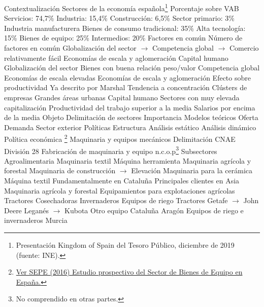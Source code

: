 \documentclass{nuevotema}
\begin{document}
\begin{esquemal}
	\1[] 
		\2 Contextualización
			\3 Sectores de la economía española\footnote{Presentación Kingdom of Spain del Tesoro Público, diciembre de 2019 (fuente: INE).}
				\4 Porcentaje sobre VAB
				\4 Servicios: 74,7\%
				\4 Industria: 15,4\%
				\4 Construcción: 6,5\%
				\4 Sector primario: 3\%
				\4 Industria manufacturera
				\4[] Bienes de consumo tradicional: 35\%
				\4[] Alta tecnología: 15\%
				\4[] Bienes de equipo: 25\%
				\4[] Intermedios: 20\%
			\3 Factores en común
				\4 Número de factores en común
				\4[] Globalización del sector
				\4[] $\to$ Competencia global
				\4[] $\to$ Comercio relativamente fácil
				\4[] Economías de escala y aglomeración
				\4[] Capital humano
			\3 Globalización del sector
				\4 Bienes con buena relación peso/valor
				\4 Competencia global
				\4 Economías de escala elevadas
			\3 Economías de escala y aglomeración
				\4 Efecto sobre productividad
				\4 Ya descrito por Marshal
				\4 Tendencia a concentración
				\4[] Clústers de empresas
				\4[] Grandes áreas urbanas
			\3 Capital humano
				\4 Sectores con muy elevada capitalización
				\4 Productividad del trabajo superior a la media
				\4 Salarios por encima de la media
		\2 Objeto
			\3 Delimitación de sectores
			\3 Importancia
			\3 Modelos teóricos
			\3 Oferta
			\3 Demanda
			\3 Sector exterior
			\3 Políticas
		\2 Estructura
			\3 Análisis estático
			\3 Análisis dinámico
			\3 Política económica
	\1 \footnote{\href{https://www.sepe.es/contenidos/observatorio/mercado_trabajo/2731-2.pdf}{Ver SEPE (2016) Estudio prospectivo del Sector de Bienes de Equipo en España.}}
		\2 Maquinaria y equipos mecánicos
			\3 Delimitación
				\4 CNAE División 28
				\4[] Fabricación de maquinaria y equipo n.c.o.p\footnote{No comprendido en otras partes.}
				\4 Subsectores
				\4[] Agroalimentaria
				\4[] Maquinaria textil
				\4[] Máquina herramienta
				\4[] Maquinaria agrícola y forestal
				\4[] Maquinaria de construcción
				\4[] $\to$ Elevación
				\4[] Maquinaria para la cerámica
			\3 Máquina textil
				\4 Fundamentalmente en Cataluña
				\4 Principales clientes en Asia
			\3 Maquinaria agrícola y forestal
				\4 Equipamientos para explotaciones agrícolas
				\4[] Tractores
				\4[] Cosechadoras
				\4[] Invernaderos
				\4[] Equipos de riego
				\4 Tractores
				\4[] Getafe
				\4[] $\to$ John Deere
				\4[] Leganés
				\4[] $\to$ Kubota
				\4 Otro equipo
				\4[] Cataluña
				\4[] Aragón
				\4 Equipos de riego e invernaderos
				\4[] Murcia

\end{esquemal}
\end{document}
